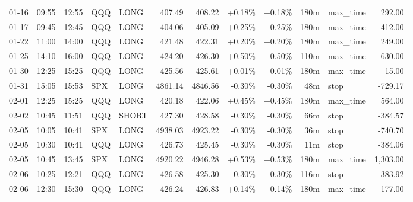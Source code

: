 \documentclass[11pt,a4paper,twoside]{article}
\begin{document}
\begin{center}
\begin{longtable}{>{\color{txtmain}}l l l l l r r r r r >{\color{txtmain}}l r}
01-16 & 09:55 & 12:55 & QQQ & LONG & 407.49 & 408.22 & \textcolor{wingreen}{+0.18\%} & \textcolor{wingreen}{+0.18\%} & 180m & max\_time & \textcolor{wingreen}{292.00} \\
01-17 & 09:45 & 12:45 & QQQ & LONG & 404.06 & 405.09 & \textcolor{wingreen}{+0.25\%} & \textcolor{wingreen}{+0.25\%} & 180m & max\_time & \textcolor{wingreen}{412.00} \\
01-22 & 11:00 & 14:00 & QQQ & LONG & 421.48 & 422.31 & \textcolor{wingreen}{+0.20\%} & \textcolor{wingreen}{+0.20\%} & 180m & max\_time & \textcolor{wingreen}{249.00} \\
01-25 & 14:10 & 16:00 & QQQ & LONG & 424.20 & 426.30 & \textcolor{wingreen}{+0.50\%} & \textcolor{wingreen}{+0.50\%} & 110m & max\_time & \textcolor{wingreen}{630.00} \\
01-30 & 12:25 & 15:25 & QQQ & LONG & 425.56 & 425.61 & \textcolor{wingreen}{+0.01\%} & \textcolor{wingreen}{+0.01\%} & 180m & max\_time & \textcolor{wingreen}{15.00} \\
01-31 & 15:05 & 15:53 & SPX & LONG & 4861.14 & 4846.56 & \textcolor{lossred}{-0.30\%} & \textcolor{lossred}{-0.30\%} & 48m & stop & \textcolor{lossred}{-729.17} \\
02-01 & 12:25 & 15:25 & QQQ & LONG & 420.18 & 422.06 & \textcolor{wingreen}{+0.45\%} & \textcolor{wingreen}{+0.45\%} & 180m & max\_time & \textcolor{wingreen}{564.00} \\
02-02 & 10:45 & 11:51 & QQQ & SHORT & 427.30 & 428.58 & \textcolor{lossred}{-0.30\%} & \textcolor{lossred}{-0.30\%} & 66m & stop & \textcolor{lossred}{-384.57} \\
02-05 & 10:05 & 10:41 & SPX & LONG & 4938.03 & 4923.22 & \textcolor{lossred}{-0.30\%} & \textcolor{lossred}{-0.30\%} & 36m & stop & \textcolor{lossred}{-740.70} \\
02-05 & 10:30 & 10:41 & QQQ & LONG & 426.73 & 425.45 & \textcolor{lossred}{-0.30\%} & \textcolor{lossred}{-0.30\%} & 11m & stop & \textcolor{lossred}{-384.06} \\
02-05 & 10:45 & 13:45 & SPX & LONG & 4920.22 & 4946.28 & \textcolor{wingreen}{+0.53\%} & \textcolor{wingreen}{+0.53\%} & 180m & max\_time & \textcolor{wingreen}{1,303.00} \\
02-06 & 10:25 & 12:21 & QQQ & LONG & 426.58 & 425.30 & \textcolor{lossred}{-0.30\%} & \textcolor{lossred}{-0.30\%} & 116m & stop & \textcolor{lossred}{-383.92} \\
02-06 & 12:30 & 15:30 & QQQ & LONG & 426.24 & 426.83 & \textcolor{wingreen}{+0.14\%} & \textcolor{wingreen}{+0.14\%} & 180m & max\_time & \textcolor{wingreen}{177.00} \\

\end{longtable}
\end{center}
\end{document}
